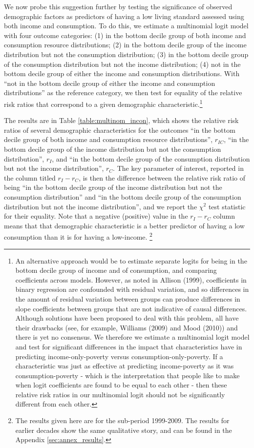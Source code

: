 We now probe this suggestion further by testing the significance of observed demographic factors as predictors of having a low living standard assessed using both income and consumption. To do this, we estimate a multinomial logit model with four outcome categories: (1) in the bottom decile group of both income and consumption resource distributions; (2) in the bottom decile group of the income distribution but not the consumption distribution; (3) in the bottom decile group of the consumption distribution but not the income distribution; (4) not in the bottom decile group of either the income and consumption distributions. With ``not in the bottom decile group of either the income and consumption distributions'' as the reference category, we then test for equality of the relative risk ratios that correspond to a given demographic characteristic.\footnote{An alternative approach would be to estimate separate logits for being in the bottom decile group of income and of consumption, and comparing coefficients across models. However, as noted in Allison (1999), coefficients in binary regression are confounded with residual variation, and so differences in the amount of residual variation between groups can produce differences in slope coefficients between groups that are not indicative of causal differences. Although solutions have been proposed to deal with this problem, all have their drawbacks (see, for example, Williams (2009) and Mood (2010)) and there is yet no consensus. We therefore we estimate a multinomial logit model and test for significant differences in the impact that characteristics have in predicting income-only-poverty versus consumption-only-poverty. If a characteristic was just as effective at predicting income-poverty as it was consumption-poverty - which is the interpretation that people like to make when logit coefficients are found to be equal to each other - then these relative risk ratios in our multinomial logit should not be significantly different from each other.}

The results are in Table \ref{table:multinom_incon}, which shows the relative risk ratios of several demographic characteristics for the outcomes ``in the bottom decile group of both income and consumption resource distributions'', $r_{IC}$, ``in the bottom decile group of the income distribution but not the consumption distribution'', $r_{I}$, and ``in the bottom decile group of the consumption distribution but not the income distribution'', $r_{C}$.  The key parameter of interest, reported in the column titled $r_{I}-r_{C}$, is then the difference between the relative risk ratio of being ``in the bottom decile group of the income distribution but not the consumption distribution'' and ``in the bottom decile group of the consumption distribution but not the income distribution'', and we report the $\chi^{2}$ test statistic for their equality. Note that a negative (positive) value in the $r_{I}-r_{C}$ column means that that demographic characteristic is a better predictor of having a low consumption than it is for having a low-income. \footnote{The results given here are for the sub-period 1999-2009. The results for earlier decades show the same qualitative story, and can be found in the Appendix \ref{sec:annex_results}.}

